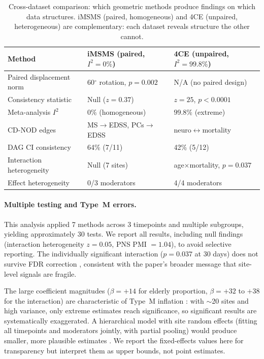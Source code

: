 \documentclass{article}
\begin{document}
\begin{table}[t]
\centering
\caption{Cross-dataset comparison: which geometric methods produce findings on which data structures. iMSMS (paired, homogeneous) and 4CE (unpaired, heterogeneous) are complementary: each dataset reveals structure the other cannot.}
\label{tab:cross_dataset}
\begin{tabular}{lll}
\toprule
Method & iMSMS (paired, $I^2=0\%$) & 4CE (unpaired, $I^2=99.8\%$) \\
\midrule
Paired displacement norm & 60$^{\circ}$ rotation, $p=0.002$ & N/A (no paired design) \\
Consistency statistic & Null ($z=0.37$) & $z=25$, $p < 0.0001$ \\
Meta-analysis $I^2$ & $0\%$ (homogeneous) & $99.8\%$ (extreme) \\
CD-NOD edges & MS$\to$EDSS, PCs$\to$EDSS & neuro$\leftrightarrow$mortality \\
DAG CI consistency & 64\% (7/11) & 42\% (5/12) \\
Interaction heterogeneity & Null (7 sites) & age$\times$mortality, $p=0.037$ \\
Effect heterogeneity & 0/3 moderators & 4/4 moderators \\
\bottomrule
\end{tabular}
\end{table}

\paragraph{Multiple testing and Type~M errors.}
This analysis applied 7 methods across 3 timepoints and multiple subgroups, yielding approximately 30 tests.
We report all results, including null findings (interaction heterogeneity $z = 0.05$, PNS PMI $= 1.04$), to avoid selective reporting.
The individually significant interaction ($p = 0.037$ at 30 days) does not survive FDR correction \cite{benjamini1995fdr}, consistent with the paper's broader message that site-level signals are fragile.

The large coefficient magnitudes ($\beta = +14$ for elderly proportion, $\beta = +32$ to $+38$ for the interaction) are characteristic of Type~M inflation \cite{gelman2014typeMS}: with $\sim$20 sites and high variance, only extreme estimates reach significance, so significant results are systematically exaggerated.
A hierarchical model with site random effects (fitting all timepoints and moderators jointly, with partial pooling) would produce smaller, more plausible estimates \cite{gelman2012multilevel}.
We report the fixed-effects values here for transparency but interpret them as upper bounds, not point estimates.
\end{document}
